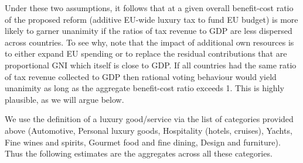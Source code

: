 \documentclass[../../main]{subfiles}
\begin{document}
Under these two assumptions, it follows that at a given overall benefit-cost ratio of the proposed reform (additive EU-wide luxury tax to fund EU budget) is more likely to garner unanimity if the ratios of tax revenue to GDP are less dispersed across countries. To see why, note that the impact of additional own resources is to either expand EU spending or to replace the residual contributions that are proportional GNI which itself is close to GDP. If all countries had the same ratio of tax revenue collected to GDP then rational voting behaviour would yield unanimity as long as the aggregate benefit-cost ratio exceeds 1. This is highly plausible, as we will argue below. 

We use the definition of a luxury good/service via the list of categories provided above (Automotive, Personal luxury goods, Hospitality (hotels, cruises), Yachts, Fine wines and spirits, Gourmet food and fine dining, Design and furniture). Thus the following estimates are the aggregates across all these categories.  
\providecommand{\EUR}[1]{\mbox{\texteuro#1}}
\end{document}
